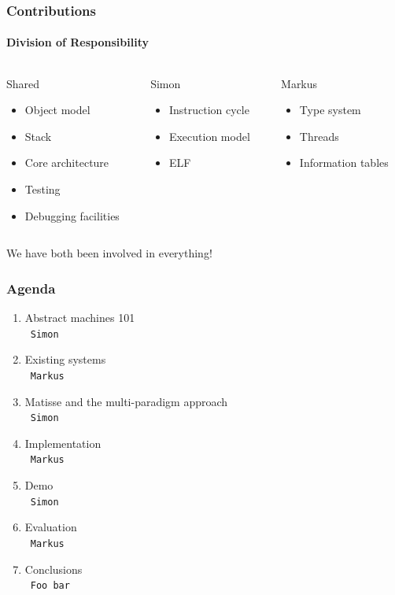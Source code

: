 \documentclass[handout]{beamer}
\newcommand{\n}[1]{\leavevmode\\~\texttt{\color{red}\tiny #1}}
\begin{document}
\begin{frame}
  \frametitle{Contributions}
  \framesubtitle{Division of Responsibility}

  \begin{columns}[onlytextwidth, t]
    \begin{column}{0.33\textwidth}
      Shared
      \fontsize{9pt}{15}\selectfont
      \begin{itemize}
      \item Object model
      \item Stack
      \item Core architecture
      \item Testing
      \item Debugging facilities
      \end{itemize}
    \end{column}

    \pause{}

    \begin{column}{0.33\textwidth}
      Simon
      \fontsize{9pt}{15}\selectfont
      \begin{itemize}
      \item Instruction cycle
      \item Execution model
      \item ELF
      \end{itemize}
    \end{column}

    \pause{}

    \begin{column}{0.33\textwidth}
      Markus
      \fontsize{9pt}{15}\selectfont
      \begin{itemize}
      \item Type system
      \item Threads
      \item Information tables
      \end{itemize}
    \end{column}
  \end{columns}

  \pause{}

  \vspace{30pt}
  \centering
  We have both been involved in everything!

\end{frame}

\begin{frame}
  \frametitle{Agenda}
  \fontsize{11pt}{20}\selectfont
  \begin{enumerate}[<+->]
  \item Abstract machines 101
    \n{Simon}
  \item Existing systems
    \n{Markus}
  \item Matisse and the multi-paradigm approach
    \n{Simon}
  \item Implementation
    \n{Markus}
  \item Demo
    \n{Simon}
  \item Evaluation
    \n{Markus}
  \item Conclusions
    \n{Foo bar}
  \end{enumerate}
\end{frame}
\end{document}

